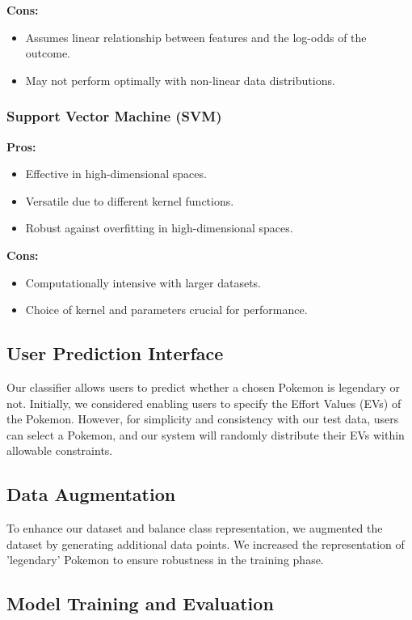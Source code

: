 \documentclass[11pt, letterpaper]{report}
\begin{document}
\textbf{Cons:}
\begin{itemize}
    \item Assumes linear relationship between features and the log-odds of the outcome.
    \item May not perform optimally with non-linear data distributions.
\end{itemize}

\subsubsection{Support Vector Machine (SVM)}
\textbf{Pros:}
\begin{itemize}
    \item Effective in high-dimensional spaces.
    \item Versatile due to different kernel functions.
    \item Robust against overfitting in high-dimensional spaces.
\end{itemize}

\textbf{Cons:}
\begin{itemize}
    \item Computationally intensive with larger datasets.
    \item Choice of kernel and parameters crucial for performance.
\end{itemize}

\subsection{User Prediction Interface}

Our classifier allows users to predict whether a chosen Pokemon is legendary or not. Initially, we considered enabling users to specify the Effort Values (EVs) of the Pokemon. However, for simplicity and consistency with our test data, users can select a Pokemon, and our system will randomly distribute their EVs within allowable constraints.

\subsection{Data Augmentation}

To enhance our dataset and balance class representation, we augmented the dataset by generating additional data points. We increased the representation of 'legendary' Pokemon to ensure robustness in the training phase.

\subsection{Model Training and Evaluation}
\end{document}
